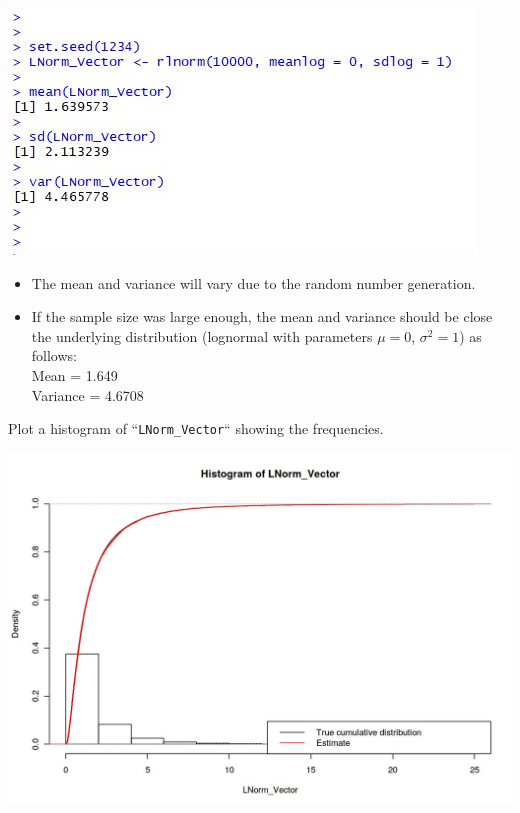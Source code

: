 \documentclass[a4paper,12pt]{article}
\begin{document}
\includegraphics[scale=1.2]{00-A2/images/lognormal_1_estimates.JPG}

\begin{itemize}
    \item The mean and variance will vary due to the random number generation. 

\item If the sample size was large enough, the mean and variance should be close the underlying
distribution (lognormal with parameters $ \mu = 0$, $\sigma^2 = 1$) as follows:\\
Mean = 1.649\\
Variance = 4.6708\\
\end{itemize}

\newpage 

Plot a histogram of ``\texttt{LNorm\_Vector}`` showing the frequencies.



\includegraphics[scale=0.4]{00-A2/images/output_23_0.jpeg}
\end{document}
